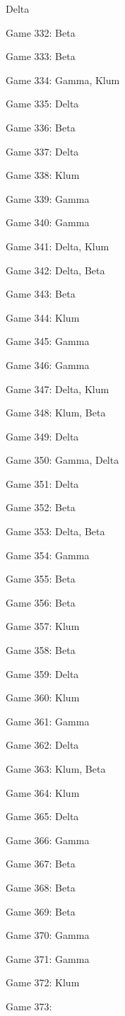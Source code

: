\documentclass{article}
\begin{document}
\begin{multicols}{3}
\begin{compactitem}
Delta
\item Game 332:
Beta
\item Game 333:
Beta
\item Game 334:
Gamma, Klum
\item Game 335:
Delta
\item Game 336:
Beta
\item Game 337:
Delta
\item Game 338:
Klum
\item Game 339:
Gamma
\item Game 340:
Gamma
\item Game 341:
Delta, Klum
\item Game 342:
Delta, Beta
\item Game 343:
Beta
\item Game 344:
Klum
\item Game 345:
Gamma
\item Game 346:
Gamma
\item Game 347:
Delta, Klum
\item Game 348:
Klum, Beta
\item Game 349:
Delta
\item Game 350:
Gamma, Delta
\item Game 351:
Delta
\item Game 352:
Beta
\item Game 353:
Delta, Beta
\item Game 354:
Gamma
\item Game 355:
Beta
\item Game 356:
Beta
\item Game 357:
Klum
\item Game 358:
Beta
\item Game 359:
Delta
\item Game 360:
Klum
\item Game 361:
Gamma
\item Game 362:
Delta
\item Game 363:
Klum, Beta
\item Game 364:
Klum
\item Game 365:
Delta
\item Game 366:
Gamma
\item Game 367:
Beta
\item Game 368:
Beta
\item Game 369:
Beta
\item Game 370:
Gamma
\item Game 371:
Gamma
\item Game 372:
Klum
\item Game 373:

\end{compactitem}
\end{multicols}
\end{document}
